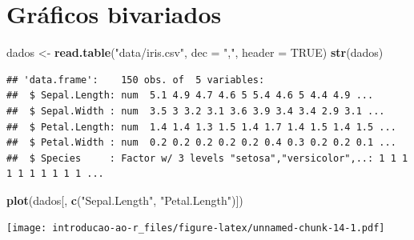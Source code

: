 \documentclass[
]{book}
\newenvironment{Shaded}{\begin{snugshade}}{\end{snugshade}}
\newcommand{\DataTypeTok}[1]{\textcolor[rgb]{0.13,0.29,0.53}{#1}}
\newcommand{\KeywordTok}[1]{\textcolor[rgb]{0.13,0.29,0.53}{\textbf{#1}}}
\newcommand{\NormalTok}[1]{#1}
\newcommand{\OtherTok}[1]{\textcolor[rgb]{0.56,0.35,0.01}{#1}}
\newcommand{\StringTok}[1]{\textcolor[rgb]{0.31,0.60,0.02}{#1}}
\begin{document}
\hypertarget{gruxe1ficos-bivariados}{%
\chapter{Gráficos bivariados}\label{gruxe1ficos-bivariados}}

\begin{Shaded}
\begin{Highlighting}[]
\NormalTok{dados <-}\StringTok{ }\KeywordTok{read.table}\NormalTok{(}\StringTok{"data/iris.csv"}\NormalTok{, }\DataTypeTok{dec =} \StringTok{","}\NormalTok{, }\DataTypeTok{header =} \OtherTok{TRUE}\NormalTok{)}
\KeywordTok{str}\NormalTok{(dados)}
\end{Highlighting}
\end{Shaded}

\begin{verbatim}
## 'data.frame':    150 obs. of  5 variables:
##  $ Sepal.Length: num  5.1 4.9 4.7 4.6 5 5.4 4.6 5 4.4 4.9 ...
##  $ Sepal.Width : num  3.5 3 3.2 3.1 3.6 3.9 3.4 3.4 2.9 3.1 ...
##  $ Petal.Length: num  1.4 1.4 1.3 1.5 1.4 1.7 1.4 1.5 1.4 1.5 ...
##  $ Petal.Width : num  0.2 0.2 0.2 0.2 0.2 0.4 0.3 0.2 0.2 0.1 ...
##  $ Species     : Factor w/ 3 levels "setosa","versicolor",..: 1 1 1 1 1 1 1 1 1 1 ...
\end{verbatim}

\begin{Shaded}
\begin{Highlighting}[]
\KeywordTok{plot}\NormalTok{(dados[, }\KeywordTok{c}\NormalTok{(}\StringTok{"Sepal.Length"}\NormalTok{, }\StringTok{"Petal.Length"}\NormalTok{)])}
\end{Highlighting}
\end{Shaded}

\texttt{[image: introducao-ao-r\_files/figure-latex/unnamed-chunk-14-1.pdf]}
\end{document}
